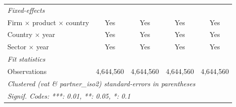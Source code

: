 \begin{table}[htbp]
\begin{tabular}{lcccc}
      \midrule
      \emph{Fixed-effects}\\
      Firm $\times$ product $\times$ country   & Yes             & Yes             & Yes          & Yes\\  
      Country $\times$ year                    & Yes             & Yes             & Yes          & Yes\\  
      Sector $\times$ year                     & Yes             & Yes             & Yes          & Yes\\  
      \midrule
      \emph{Fit statistics}\\
      Observations                             & 4,644,560       & 4,644,560       & 4,644,560    & 4,644,560\\  
      \midrule \midrule
      \multicolumn{5}{l}{\emph{Clustered (vat \& partner\_iso2) standard-errors in parentheses}}\\
      \multicolumn{5}{l}{\emph{Signif. Codes: ***: 0.01, **: 0.05, *: 0.1}}\\
   \end{tabular}
\end{table}


